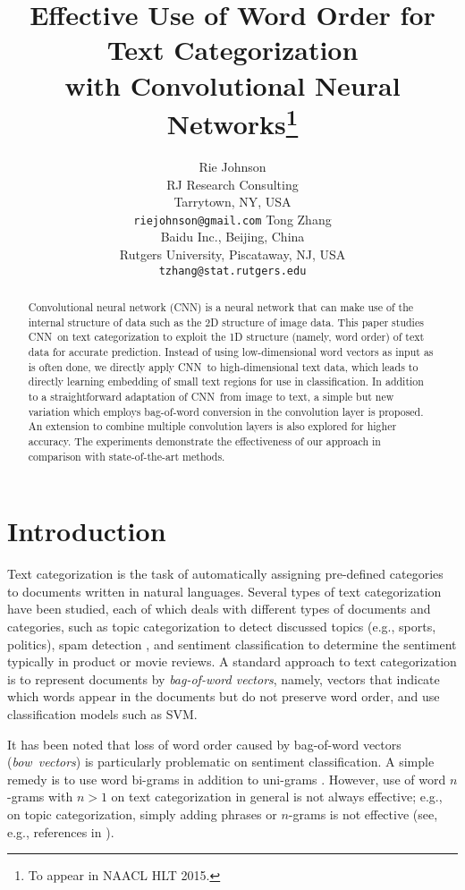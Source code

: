 \documentclass[11pt,letterpaper]{article}
\title{Effective Use of Word Order for Text Categorization \\ with Convolutional Neural Networks\thanks{
To appear in NAACL HLT 2015. 
}}
\author{Rie Johnson\\
	    RJ Research Consulting\\
	    Tarrytown, NY, USA\\
	    {\tt riejohnson@gmail.com}
	  \And
	Tong Zhang\\
    Baidu Inc., Beijing, China \\    
    Rutgers University, Piscataway, NJ, USA \\
  {\tt tzhang@stat.rutgers.edu}
}
\date{}
\newcommand{\cnn}{CNN}
\newcommand{\bow}{{bow}}
\begin{document}
\maketitle
\begin{abstract}
Convolutional neural network (\cnn) is a neural network that can make use of 
the internal structure of data such as the 2D structure of image data.  
This paper studies \cnn\ on text categorization to exploit
the 1D structure (namely, word order) of text data for accurate prediction.  
Instead of using low-dimensional word vectors as input as is often done, 
we directly apply \cnn\ to high-dimensional text data, which leads to 
directly learning embedding of small text regions for use in classification.  
In addition to a straightforward adaptation of \cnn\ from image to text, 
a simple but new variation which employs bag-of-word conversion in the 
convolution layer is proposed.  
An extension to combine multiple convolution layers is also explored for higher 
accuracy.    
The experiments demonstrate the effectiveness of our approach in comparison with 
state-of-the-art methods.


\end{abstract}

\section{Introduction}

Text categorization is the task of automatically assigning pre-defined categories to 
documents written in natural languages.  
Several types of text categorization have been studied, each of which deals with 
different types of documents and categories, 
such as topic categorization to detect discussed topics (e.g., sports, politics), 
spam detection \cite{SDHH98}, and sentiment classification \cite{PLV02,PL08,MDPHNP11} 
to determine the sentiment typically in product or movie reviews.  
A standard approach to text categorization 
is to represent documents by {\em bag-of-word vectors}, 
namely, vectors that indicate which words appear in the documents but do not preserve
word order, and use classification models such as SVM. 

It has been noted that loss of word order caused by bag-of-word vectors 
({\em \bow\ vectors}) is particularly problematic on sentiment classification.  
A simple remedy is to use word bi-grams in addition to uni-grams 
\cite{BDP07,GBB11,WM12}. 
However, 
use of word $n$-grams with $n>1$ on text categorization in general is not always 
effective; e.g.,   
on topic categorization, simply adding phrases or $n$-grams 
is not effective (see, e.g., references in \cite{TWL02}).  
\end{document}
